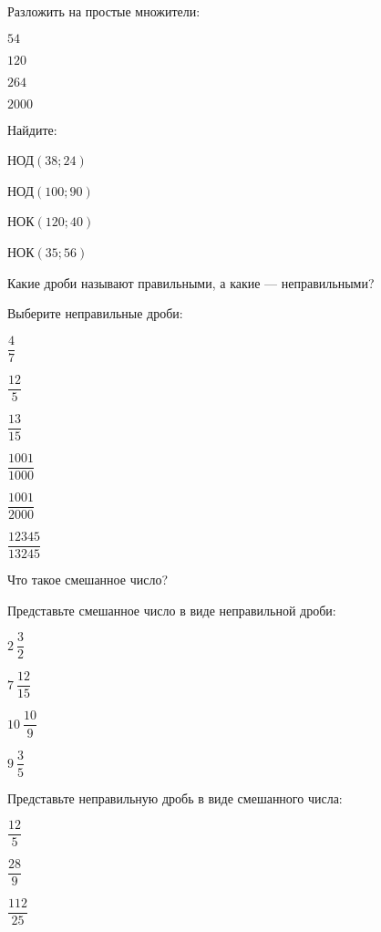 \begin{listofex}
	\item Разложить на простые множители:
	\begin{enumcols}[itemcolumns=4]
		\item \( 54 \)
		\item \( 120 \)
		\item \( 264 \)
		\item \( 2000 \)
	\end{enumcols}
	\item Найдите:
	\begin{enumcols}[itemcolumns=4]
		\item НОД\( (38; 24) \)
		\item НОД\( (100; 90) \)
		\item НОК\( (120; 40) \)
		\item НОК\( (35; 56) \)
	\end{enumcols}
	\item Какие дроби называют правильными, а какие --- неправильными?
	\item Выберите неправильные дроби:
	\begin{enumcols}[itemcolumns=6]
		\item \( \dfrac{4}{7} \)
		\item \( \dfrac{12}{5} \)
		\item \( \dfrac{13}{15} \)
		\item \( \dfrac{1001}{1000} \)
		\item \( \dfrac{1001}{2000} \)
		\item \( \dfrac{12345}{13245} \)
	\end{enumcols}
	\item Что такое смешанное число?
	\item Представьте смешанное число в виде неправильной дроби:
	\begin{enumcols}[itemcolumns=4]
		\item \( 2\:\dfrac{3}{2} \)
		\item \( 7\:\dfrac{12}{15} \)
		\item \( 10\:\dfrac{10}{9} \)
		\item \( 9\:\dfrac{3}{5} \)
	\end{enumcols}
	\item Представьте неправильную дробь в виде смешанного числа:
	\begin{enumcols}[itemcolumns=6]
		\item \( \dfrac{12}{5} \)
		\item \( \dfrac{28}{9} \)
		\item \( \dfrac{112}{25} \)

\end{enumcols}
\end{listofex}
